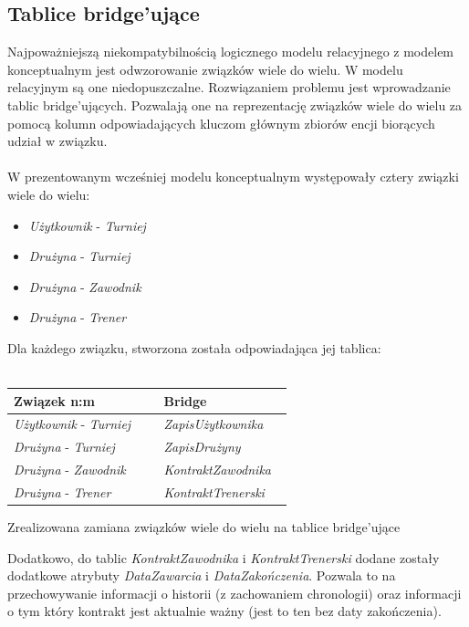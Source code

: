 \documentclass{mwrep}[15pt]
\begin{document}
\subsection{Tablice bridge'ujące}
Najpoważniejszą niekompatybilnością logicznego modelu relacyjnego z modelem konceptualnym jest odwzorowanie związków
wiele do wielu. W modelu relacyjnym są one niedopuszczalne. Rozwiązaniem problemu jest wprowadzanie tablic bridge'ujących.
Pozwalają one na reprezentację związków wiele do wielu za pomocą kolumn odpowiadających kluczom głównym zbiorów encji biorących
udział w związku\cite{Kowalczyk1}.\\
\\
\indent W prezentowanym wcześniej modelu konceptualnym występowały cztery związki wiele do wielu: 
\\
\begin{itemize}
	\item \emph{Użytkownik} - \emph{Turniej}
	\item \emph{Drużyna} - \emph{Turniej}
	\item \emph{Drużyna} - \emph{Zawodnik}
	\item \emph{Drużyna} - \emph{Trener}
\end{itemize}
\vspace{0.5cm}
Dla każdego związku, stworzona została odpowiadająca jej tablica: \\
\\
\begin{threeparttable}[H]
	\begin{tabular}{|p{0.5\linewidth}|p{0.43\linewidth}|}
	\hline
	Związek n:m &  Bridge \\ \hline
	\emph{Użytkownik} - \emph{Turniej} & \emph{ZapisUżytkownika} \\ \hline
	\emph{Drużyna} - \emph{Turniej} &  \emph{ZapisDrużyny} \\ \hline
	\emph{Drużyna} - \emph{Zawodnik} &  \emph{KontraktZawodnika} \\ \hline
	\emph{Drużyna} - \emph{Trener} &  \emph{KontraktTrenerski} \\ \hline
	\end{tabular}	
	\caption{Zrealizowana zamiana związków wiele do wielu na tablice bridge'ujące}
\end{threeparttable}
\vspace{0.5cm}

Dodatkowo, do tablic \emph{KontraktZawodnika} i \emph{KontraktTrenerski} dodane zostały dodatkowe 
atrybuty \emph{DataZawarcia} i \emph{DataZakończenia}. Pozwala to na przechowywanie informacji o historii
(z zachowaniem chronologii) oraz informacji o tym który kontrakt jest aktualnie ważny (jest to ten bez 
daty zakończenia).
\end{document}
